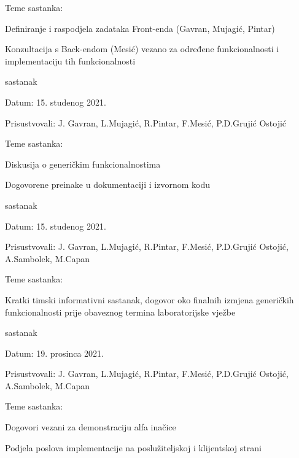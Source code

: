 \begin{packed_enum}
\begin{packed_item}
    			\item Teme sastanka:
    			\begin{packed_item}
    				\item Definiranje i raspodjela zadataka Front-enda (Gavran, Mujagić, Pintar)
    				\item Konzultacija s Back-endom (Mesić) vezano za određene funkcionalnosti i implementaciju tih funkcionalnosti 
    			\end{packed_item}
    		\end{packed_item}	
    		\item  sastanak
    		\item[] \begin{packed_item}
    			\item Datum: 15. studenog 2021.
    			\item Prisustvovali: J. Gavran, L.Mujagić, R.Pintar, F.Mesić, P.D.Grujić Ostojić
    			\item Teme sastanka:
    			\begin{packed_item}
    				\item Diskusija o generičkim funkcionalnostima 
    				\item Dogovorene preinake u dokumentaciji i izvornom kodu
    			\end{packed_item}
    		\end{packed_item}	
    	
	    	\item  sastanak
	    	\item[] \begin{packed_item}
	    		\item Datum: 15. studenog 2021.
	    		\item Prisustvovali: J. Gavran, L.Mujagić, R.Pintar, F.Mesić, P.D.Grujić Ostojić, A.Sambolek, M.Capan
	    		\item Teme sastanka:
	    		\begin{packed_item}
	    			\item Kratki timski informativni sastanak, dogovor oko finalnih izmjena generičkih funkcionalnosti prije obaveznog termina laboratorijske vježbe
	    		\end{packed_item}
	    	\end{packed_item}	
		\item sastanak
		\item[] \begin{packed_item}
    			\item Datum: 19. prosinca 2021.
    			\item Prisustvovali: J. Gavran, L.Mujagić, R.Pintar, F.Mesić, P.D.Grujić Ostojić, A.Sambolek, M.Capan
    			\item Teme sastanka:
    			\begin{packed_item}
    				\item Dogovori vezani za demonstraciju alfa inačice
    				\item Podjela poslova implementacije na poslužiteljskoj i klijentskoj strani
    			\end{packed_item}
    		\end{packed_item}
    	

\end{packed_enum}
